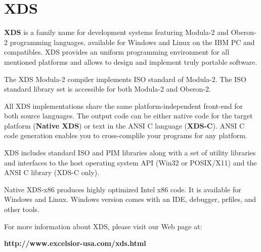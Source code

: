 







\appendix

\chapter{XDS}
\label{XDS}

{\bf XDS} is a family name for development systems featuring
Modula-2 and Oberon-2 programming languages, available for Windows and Linux
on the IBM PC and compatibles. XDS provides an uniform programming environment
for all mentioned platforms and allows to design and implement truly
portable software.

The XDS Modula-2 compiler implements ISO standard of Modula-2.
The ISO standard library set is accessible for both Modula-2 and
Oberon-2.

All XDS implementations share the same platform-independent front-end
for both source languages. The output code can be either native code
for the target platform ({\bf Native XDS}) or text in the ANSI C language
({\bf XDS-C}). ANSI C code generation enables you to cross-complile
your programs for any platform.

XDS includes standard ISO and PIM libraries along with a set of utility
libraries and interfaces to the host operating system API (Win32 or POSIX/X11)
and the ANSI C library (XDS-C only).

Native XDS-x86 produces highly optimized Intel x86 code.
It is available for Windows and Linux. Windows version comes with
an IDE, debugger, prfiles, and other tools.

\begin{center}
For more information about XDS, please visit our Web page at:

{\bf http://www.excelsior-usa.com/xds.html}

\end{center}

\printindex


